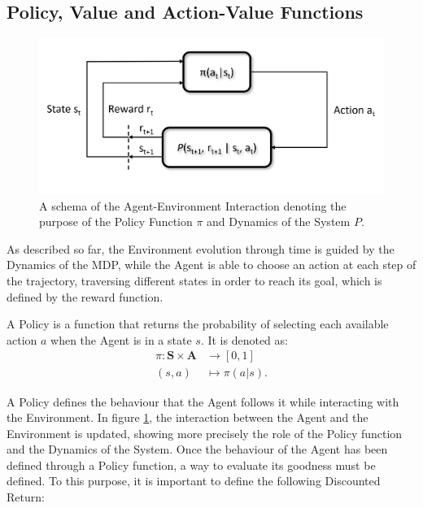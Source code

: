         \subsection{Policy, Value and Action-Value Functions}
            \label{subs:PVQ}
            
            \begin{figure}[t]
                \centering
                \includegraphics[width=14cm, keepaspectratio]{images/mdp/int_schema_def.png}
                \caption{A schema of the Agent-Environment Interaction denoting the purpose of the Policy Function $\pi$ and Dynamics of the System $P$.}
                \label{fig:int_schema_def}
            \end{figure}
            
            As described so far, the Environment evolution through time is guided by the Dynamics of the MDP, while the Agent is able to choose an action at each step of the trajectory, traversing different states in order to reach its goal, which is defined by the reward function. 
            
            \begin{definition}[Policy]
                \label{def:policy}
                A Policy is a function that returns the probability of selecting each available action $a$ when the Agent is in a state $s$. It is denoted as:
                \begin{align*}
                  \pi : \mathbf{S} \times \mathbf{A} &\rightarrow [0, 1]\\
                  (s,a) &\mapsto \pi(a|s).
                \end{align*}
            \end{definition}
            \noindent
            A Policy defines the behaviour that the Agent follows it while interacting with the Environment. In figure \ref{fig:int_schema_def}, the interaction between the Agent and the Environment is updated, showing more precisely the role of the Policy function and the Dynamics of the System. Once the behaviour of the Agent has been defined through a Policy function, a way to evaluate its goodness must be defined. To this purpose, it is important to define the following Discounted Return:
            
